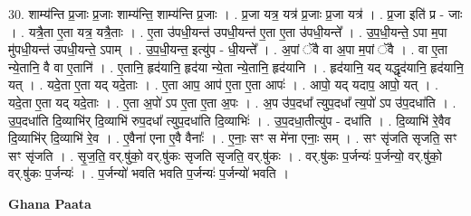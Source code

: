 \documentclass[17pt]{extarticle}
\begin{document}
30. शाम्य॑न्ति प्र॒जाः प्र॒जाः शाम्य॑न्ति॒ शाम्य॑न्ति प्र॒जाः । . प्र॒जा यत्र॒ यत्र॑ प्र॒जाः प्र॒जा यत्र॑ । . प्र॒जा इति॑ प्र - जाः । . यत्रै॒ता ए॒ता यत्र॒ यत्रै॒ताः । . ए॒ता उ॑पधी॒यन्त॑ उपधी॒यन्त॑ ए॒ता ए॒ता उ॑पधी॒यन्ते᳚ । . उ॒प॒धी॒यन्ते॒ ऽपा म॒पा मु॑पधी॒यन्त॑ उपधी॒यन्ते॒ ऽपाम् । . उ॒प॒धी॒यन्त॒ इत्यु॑प - धी॒यन्ते᳚ । . अ॒पां ॅवै वा अ॒पा म॒पां ॅवै । . वा ए॒ता न्ये॒तानि॒ वै वा ए॒तानि॑ । . ए॒तानि॒ हृद॑यानि॒ हृद॑या न्ये॒ता न्ये॒तानि॒ हृद॑यानि । . हृद॑यानि॒ यद् यद्धृद॑यानि॒ हृद॑यानि॒ यत् । . यदे॒ता ए॒ता यद् यदे॒ताः । . ए॒ता आप॒ आप॑ ए॒ता ए॒ता आपः॑ । . आपो॒ यद् यदाप॒ आपो॒ यत् । . यदे॒ता ए॒ता यद् यदे॒ताः । . ए॒ता अ॒पो॑ ऽप ए॒ता ए॒ता अ॒पः । . अ॒प उ॑प॒दधा᳚ त्युप॒दधा᳚ त्य॒पो॑ ऽप उ॑प॒दधा॑ति । . उ॒प॒दधा॑ति दि॒व्याभि॑र् दि॒व्याभि॑ रुप॒दधा᳚ त्युप॒दधा॑ति दि॒व्याभिः॑ । . उ॒प॒दधा॒तीत्यु॑प - दधा॑ति । . दि॒व्याभि॑ रे॒वैव दि॒व्याभि॑र् दि॒व्याभि॑ रे॒व । . ए॒वैना॑ एना ए॒वै वैनाः᳚ । . ए॒नाः॒ सꣳ स मे॑ना एनाः॒ सम् । . सꣳ सृ॑जति सृजति॒ सꣳ सꣳ सृ॑जति । . सृ॒ज॒ति॒ वर्.षु॑को॒ वर्.षु॑कः सृजति सृजति॒ वर्.षु॑कः । . वर्.षु॑कः प॒र्जन्यः॑ प॒र्जन्यो॒ वर्.षु॑को॒ वर्.षु॑कः प॒र्जन्यः॑ । . प॒र्जन्यो॑ भवति भवति प॒र्जन्यः॑ प॒र्जन्यो॑ भवति । \newline

\textbf{Ghana Paata } \newline
\end{document}
